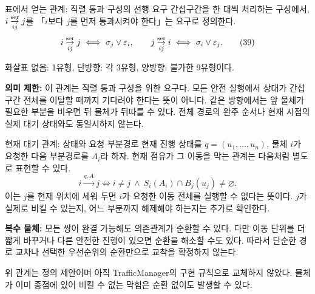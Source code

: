 \begin{frame}{표에서 얻는 관계: 직렬 통과 구성의 선행 요구}
\small
간섭구간을 한 대씩 처리하는 구성에서, $i\mathrel{\mathop{\to}\limits^{\rm ser}_{ij}}j$를
「$i$보다 $j$를 먼저 통과시켜야 한다」는 요구로 정의한다.
\begin{equation}
 i\mathrel{\mathop{\to}\limits^{\rm ser}_{ij}}j
 \iff\sigma_j\lor\varepsilon_i,\qquad
 j\mathrel{\mathop{\to}\limits^{\rm ser}_{ij}}i
 \iff\sigma_i\lor\varepsilon_j.
 \tag{39}
\end{equation}
\begin{center}\end{center}
화살표 없음: 1유형, 단방향: 각 3유형, 양방향: 불가한 9유형이다.
\par\medskip
\textbf{의미 제한:} 이 관계는 직렬 통과 구성을 위한 요구다.
모든 안전 실행에서 상대가 간섭구간 전체를 이탈할 때까지 기다려야 한다는 뜻이 아니다.
같은 방향에서는 앞 물체가 필요한 부분을 비우면 뒤 물체가 뒤따를 수 있다.
전체 경로의 완주 순서나 현재 시점의 실제 대기 상태와도 동일시하지 않는다.
\end{frame}

\begin{frame}{현재 대기 관계: 상태와 요청 부분경로}
\small
현재 진행 상태를 $q=(u_1,\ldots,u_n)$, 물체 $i$가 요청한 다음 부분경로를 $A_i$라 하자.
현재 점유가 그 이동을 막는 관계는 다음처럼 별도로 표현할 수 있다.
\begin{equation}
 i\mathrel{\mathop{\to}\limits^{q,A}}j
 \iff i\ne j\ \land\ S_i(A_i)\cap B_j(u_j)\ne\varnothing.
 \tag{40}
\end{equation}
이는 $j$를 현재 위치에 세워 두면 $i$가 요청한 이동 전체를 실행할 수 없다는 뜻이다.
$j$가 실제로 비킬 수 있는지, 어느 부분까지 해제해야 하는지는 추가로 확인한다.
\par\medskip
\begin{center}\end{center}
\textbf{복수 물체:} 모든 쌍이 완결 가능해도 의존관계가 순환할 수 있다.
다만 이동 단위를 더 짧게 바꾸거나 다른 안전한 진행이 있으면 순환을 해소할 수도 있다.
따라서 단순한 경로 교차나 선택한 우선순위의 순환만으로 교착을 확정하지 않는다.
\par\smallskip\footnotesize
위 관계는 정의 제안이며 아직 TrafficManager의 구현 규칙으로 교체하지 않았다.
물체가 이미 종점에 있어 비킬 수 없는 막힘은 순환 없이도 발생할 수 있다.
\end{frame}

